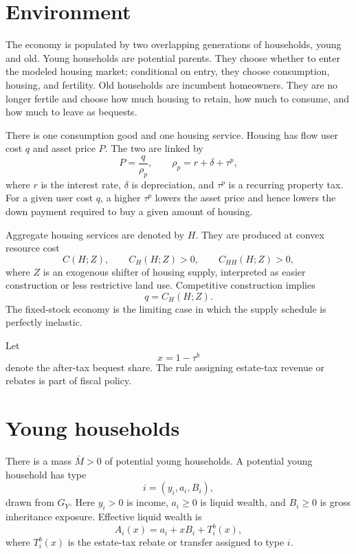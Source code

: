 \documentclass[11pt]{article}
\newcommand{\1}{\mathbf 1}
\begin{document}
\section{Environment}

The economy is populated by two overlapping generations of households, young and old. Young households are potential parents. They choose whether to enter the modeled housing market; conditional on entry, they choose consumption, housing, and fertility. Old households are incumbent homeowners. They are no longer fertile and choose how much housing to retain, how much to consume, and how much to leave as bequests.

There is one consumption good and one housing service. Housing has flow user cost $q$ and asset price $P$. The two are linked by
\begin{equation}
P=\frac{q}{\rho_p},
\qquad
\rho_p=r+\delta+\tau^p,
\label{eq:compact_price}
\end{equation}
where $r$ is the interest rate, $\delta$ is depreciation, and $\tau^p$ is a recurring property tax. For a given user cost $q$, a higher $\tau^p$ lowers the asset price and hence lowers the down payment required to buy a given amount of housing.

Aggregate housing services are denoted by $H$. They are produced at convex resource cost
\begin{equation}
C(H;Z),
\qquad
C_H(H;Z)>0,
\qquad
C_{HH}(H;Z)>0,
\label{eq:compact_cost}
\end{equation}
where $Z$ is an exogenous shifter of housing supply, interpreted as easier construction or less restrictive land use. Competitive construction implies
\begin{equation}
q=C_H(H;Z).
\label{eq:compact_supply_foc}
\end{equation}
The fixed-stock economy is the limiting case in which the supply schedule is perfectly inelastic.

Let
\begin{equation}
x=1-\tau^b
\end{equation}
denote the after-tax bequest share. The rule assigning estate-tax revenue or rebates is part of fiscal policy.

\section{Young households}

There is a mass $\bar M>0$ of potential young households. A potential young household has type
\[
i=(y_i,a_i,B_i),
\]
drawn from $G_Y$. Here $y_i>0$ is income, $a_i\ge0$ is liquid wealth, and $B_i\ge0$ is gross inheritance exposure. Effective liquid wealth is
\begin{equation}
A_i(x)=a_i+xB_i+T_i^b(x),
\label{eq:compact_liquid_wealth}
\end{equation}
where $T_i^b(x)$ is the estate-tax rebate or transfer assigned to type $i$.
\end{document}
